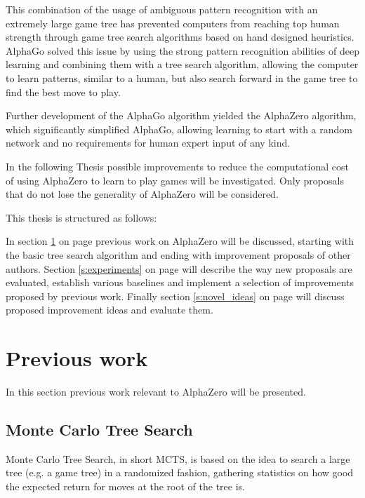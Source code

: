\documentclass[12pt,onecolumn,oneside,titlepage]{article}
\begin{document}
This combination of the usage of ambiguous pattern recognition with an extremely large game tree has prevented computers from reaching top human strength through game tree search algorithms based on hand designed heuristics.
AlphaGo solved this issue by using the strong pattern recognition abilities of deep learning and combining them with a tree search algorithm, allowing the computer to learn patterns, similar to a human, but also search forward in the game tree to find the best move to play.

Further development of the AlphaGo algorithm yielded the AlphaZero algorithm, which significantly simplified AlphaGo, allowing learning to start with a random network and no requirements for human expert input of any kind.

In the following Thesis possible improvements to reduce the computational cost of using AlphaZero to learn to play games will be investigated. Only proposals that do not lose the generality of AlphaZero will be considered.

This thesis is structured as follows:

In section \ref{sec:prev_work} on page \pageref{sec:prev_work} previous work on AlphaZero will be discussed, starting with the basic tree search algorithm and ending with improvement proposals of other authors.
Section \ref{s:experiments} on page \pageref{s:experiments} will describe the way new proposals are evaluated, establish various baselines and implement a selection of improvements proposed by previous work.
Finally section \ref{s:novel_ideas} on page \pageref{s:novel_ideas} will discuss proposed improvement ideas and evaluate them.

\section{Previous work} \label{sec:prev_work}

In this section previous work relevant to AlphaZero will be presented.

\subsection{Monte Carlo Tree Search}
\label{s:mcts}

Monte Carlo Tree Search, in short MCTS, is based on the idea to search a large tree (e.g. a game tree) in a randomized fashion, gathering statistics on how good the expected return for moves at the root of the tree is.
\end{document}
